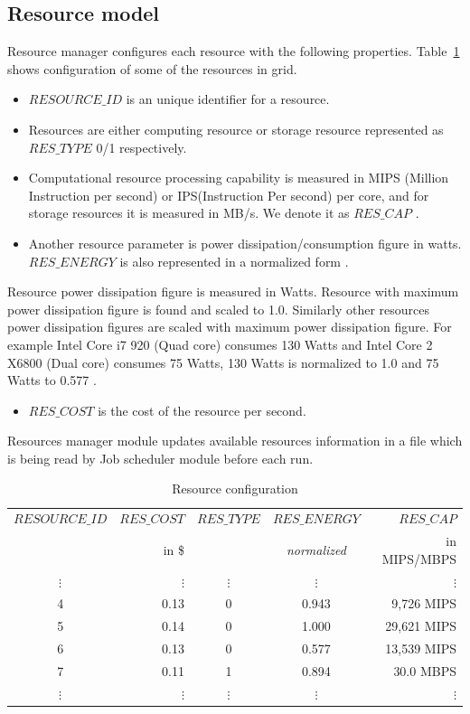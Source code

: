\subsection{Resource model}
Resource manager configures each resource with the following properties. Table~\ref{resconf} shows configuration of some of the resources in grid.
\begin{itemize}
 \item $RESOURCE\_ID$ is an unique identifier for a resource.
 \item Resources are either computing resource or storage resource represented as $RES\_TYPE$ 0/1 respectively.
 \item Computational resource processing capability is measured in MIPS (Million Instruction per second) or IPS(Instruction Per second) per core, and for storage resources it is measured in MB/s. We denote it as $RES\_CAP$ \cite{wiki_CPU}.
 \item Another resource parameter is power dissipation/consumption figure in watts. $RES\_ENERGY$ is also represented in a normalized form \cite{wiki_wattage}.
\end{itemize}
\begin{framed}
{\small
	     Resource power dissipation figure is measured in Watts. Resource with maximum power dissipation figure is found and scaled to 1.0. Similarly other resources power dissipation figures are scaled with maximum power dissipation figure. For example Intel Core i7 920 (Quad core) consumes 130 Watts and Intel Core 2  X6800 (Dual core) consumes 75 Watts, 130 Watts is normalized to 1.0 and 75 Watts to 0.577 \cite{wiki_wattage}.
}
\end{framed}
\begin{itemize}
 \item $RES\_COST$ is the cost of the resource per second.
\end{itemize}
Resources manager module updates available resources information in a file which is being read  by Job scheduler module before each run.
\begin{table}[ht]
\caption{Resource configuration}
    \begin{tabular}{|c|r|c|c|r|}
    \hline \hline
    $RESOURCE\_ID$ & $RES\_COST$ & $RES\_TYPE$ & $RES\_ENERGY$  & $RES\_CAP$ \\ 
     & in \$ &  & \emph{normalized}  & {\small in MIPS/MBPS} \\ \hline \hline
    $\vdots$ & $\vdots$ & $\vdots$   & $\vdots$ & $\vdots$  \\
    4 & 0.13 & 0 & 0.943 & 9,726 MIPS   \\
    5 & 0.14 & 0 & 1.000 & 29,621 MIPS   \\
    6 & 0.13 & 0 & 0.577 & 13,539 MIPS \\
    7 & 0.11 & 1 & 0.894 & 30.0 MBPS     \\
    $\vdots$ & $\vdots$ & $\vdots$   & $\vdots$ & $\vdots$  \\ \hline
    \end{tabular}
\label{resconf}
\end{table}

